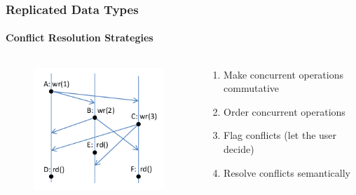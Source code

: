 \documentclass[11pt]{beamer}
\begin{document}
\begin{frame}
\frametitle{Replicated Data Types}
\framesubtitle{Conflict Resolution Strategies}

\begin{columns}
\begin{column}{5cm}
\begin{figure}
\includegraphics[scale=0.6]{update_replicas.png}
\end{figure}
\end{column}
\begin{column}{5cm}
\pause
\begin{enumerate}
\item Make concurrent operations commutative
\pause
\item Order concurrent operations
\pause
\item Flag conflicts (let the user decide)
\pause
\item Resolve conflicts semantically
\end{enumerate}
\end{column}
\end{columns}
\end{frame}
\end{document}
